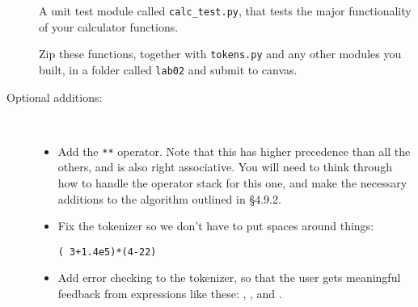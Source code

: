 \documentclass{article}
\newcommand{\bi}{\begin{itemize}}
\newcommand{\li}{\item}
\newcommand{\ei}{\end{itemize}}
\begin{document}
\begin{description}
A unit test module called \lstinline{calc_test.py}, that tests the major
functionality of your calculator functions.

Zip these functions, together with \lstinline{tokens.py} and any other
modules you built, in a folder called \lstinline{lab02} and submit to canvas.

\item[Optional additions:]~ 

\bi
\li Add the \lstinline{**} operator.  Note that this has higher precedence
than all the others, and is also right associative.  You will need to think through
how to handle the operator stack for this one, and make the necessary
additions to the algorithm outlined in \S 4.9.2.

\li Fix the tokenizer so we don't have
to put spaces around things:
\begin{lstlisting}
( 3+1.4e5)*(4-22)
\end{lstlisting}

\li Add error checking to the tokenizer, so that the user gets meaningful
feedback from expressions like these:
, 
, and
.


\ei


\end{description}
\end{document}
